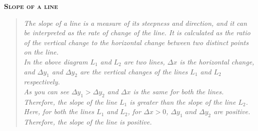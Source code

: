 \begin{center}
    \textsc{\Large\textbf{Slope of a line}}
\end{center}
    \begin{center}
    \end{center}
    \begin{quote}
        \textit{
            The slope of a line is a measure of its steepness and direction, and it can be interpreted as the rate of change of the line. It is calculated as the ratio of the vertical change to the horizontal change between two distinct points on the line.\\[2mm]
            In the above diagram $L_1$ and $L_2$ are two lines, $\Delta x$ is the horizontal change, and $\Delta y_1$ and $\Delta y_2$ are the vertical changes of the lines $L_1$ and $L_2$ respectively.\\[2mm]
            As you can see $\Delta y_1 > \Delta y_2$ and $\Delta x$ is the same for both the lines. Therefore, the slope of the line $L_1$ is greater than the slope of the line $L_2$.\\[2mm]
            Here, for both the lines $L_1$ and $L_2$, for $\Delta x > 0$, $\Delta y_1 \textit{ and } \Delta y_2$ are positive. Therefore, the slope of the line is positive.
        }
    \end{quote}
